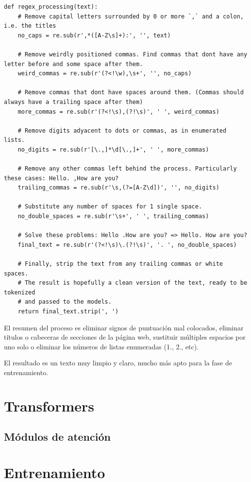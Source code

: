 \begin{verbatim}
def regex_processing(text):
    # Remove capital letters surrounded by 0 or more `,` and a colon, i.e. the titles
    no_caps = re.sub(r',*([A-Z\s]+):', '', text)

    # Remove weirdly positioned commas. Find commas that dont have any letter before and some space after them.
    weird_commas = re.sub(r'(?<!\w),\s+', '', no_caps)
    
    # Remove commas that dont have spaces around them. (Commas should always have a trailing space after them)
    more_commas = re.sub(r'(?<!\s),(?!\s)', ' ', weird_commas)

    # Remove digits adyacent to dots or commas, as in enumerated lists.
    no_digits = re.sub(r'[\.,]*\d[\.,]+', ' ', more_commas)

    # Remove any other commas left behind the process. Particularly these cases: Hello. ,How are you?
    trailing_commas = re.sub(r'\s,(?=[A-Z\d])', '', no_digits)

    # Substitute any number of spaces for 1 single space.
    no_double_spaces = re.sub(r'\s+', ' ', trailing_commas)

    # Solve these problems: Hello .How are you? => Hello. How are you?
    final_text = re.sub(r'(?<!\s)\.(?!\s)', '. ', no_double_spaces)

    # Finally, strip the text from any trailing commas or white spaces.
    # The result is hopefully a clean version of the text, ready to be tokenized
    # and passed to the models.
    return final_text.strip(', ')
\end{verbatim}

El resumen del proceso es eliminar signos de puntuación mal colocados, eliminar títulos o cabeceras de secciones de la página web, sustituir múltiples espacios por uno solo o eliminar los números de listas enumeradas (1., 2., etc).

El resultado es un texto muy limpio y claro, mucho más apto para la fase de entrenamiento.



\section{Transformers}
\subsection{Módulos de atención}

\section{Entrenamiento}